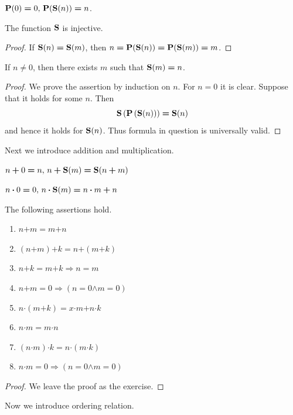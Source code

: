 \documentclass[10pt]{amsart}
\newcommand{\mra}{\boldsymbol{\Rightarrow}}
\newcommand{\mand}{\boldsymbol{\wedge}}
\newcommand{\meq}{\boldsymbol{=}}
\newcommand{\mneq}{\boldsymbol{\neq}}
\newcommand{\mplus}{\boldsymbol{+}}
\newcommand{\mdot}{\boldsymbol{\cdot}}
\begin{document}
\begin{definition}
	$\bd{P}(0) \meq 0,\,\bd{P}(\bd{S}(n)) \meq n$.
\end{definition}

\begin{corollary}\label{corollary:the_successor_is_injective}
	The function $\mathbf{S}$ is injective.
\end{corollary}
\begin{proof}
	If $\bd{S}(n) \meq \bd{S}(m)$, then $n \meq \bd{P}(\bd{S}(n)) \meq \bd{P}(\bd{S}(m)) \meq m$.
\end{proof}

\begin{corollary}\label{corollary:nonzero_is_successor}
	If $n \mneq 0$, then there exists $m$ such that $\bd{S}(m) \meq n$.
\end{corollary}
\begin{proof}
	We prove the assertion by induction on $n$. For $n \meq 0$ it is clear. Suppose that it holds for some $n$. Then
	$$\bd{S}\left(\bd{P}\left(\bd{S}(n)\right)\right) \meq \bd{S}(n)$$
	and hence it holds for $\mathbf{S}(n)$. Thus formula in question is universally valid.
\end{proof}
\noindent
Next we introduce addition and multiplication.

\begin{definition}
	$n \mplus 0 \meq n,\,n \mplus \bd{S}(m) \meq \bd{S}(n \mplus m)$
\end{definition}

\begin{definition}
	$n\mdot 0 \meq 0,\,n\mdot \bd{S}(m) \meq n\mdot m \mplus n$
\end{definition}

\begin{theorem}\label{theorem:basic_properties_of_addition_and_multiplication}
	The following assertions hold.
	\begin{enumerate}[label=\emph{\textbf{(\arabic*)}}, leftmargin=3.0em]
		\item $n \mplus m \meq m \mplus n$
		\item $(n \mplus m) \mplus k \meq n \mplus (m \mplus k)$
		\item $n \mplus k \meq m \mplus k \mra n \meq m$
		\item $n \mplus m \meq 0 \mra (n \meq 0 \mand m \meq 0)$
		\item $n\mdot (m \mplus k) \meq x\mdot m \mplus n\mdot k$
		\item $n\mdot m \meq m \mdot n$
		\item $(n \mdot m) \mdot k \meq n \mdot (m \mdot k)$
		\item $n\mdot m \meq 0 \mra (n \meq 0 \mand m \meq 0)$
	\end{enumerate}
\end{theorem}
\begin{proof}
	We leave the proof as the exercise.
\end{proof}
\noindent
Now we introduce ordering relation.
\end{document}

